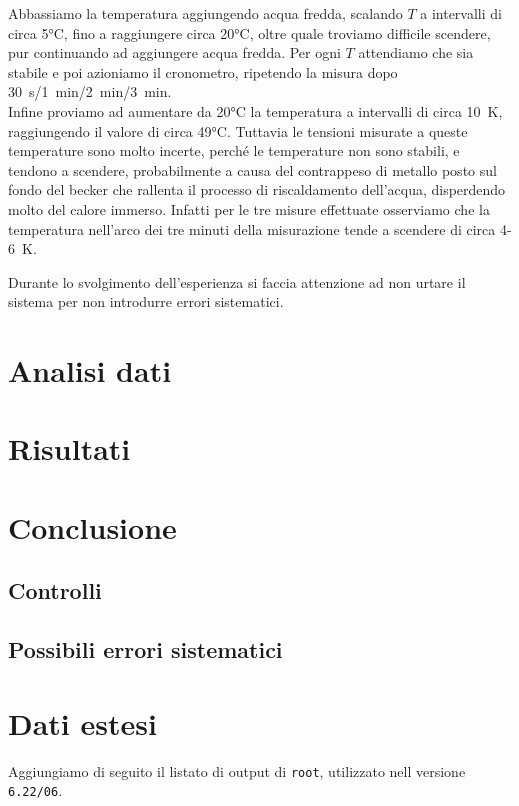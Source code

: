 \documentclass[italian, a4paper, 10pt, twocolumn]{../../style/lab_unige}
\newcommand{\cernroot}{\texttt{root}}
\begin{document}
    
    
    Abbassiamo la temperatura aggiungendo acqua fredda, scalando $T$ a intervalli di circa 5°C, fino a raggiungere circa 20°C, oltre quale troviamo difficile scendere, pur continuando ad aggiungere acqua fredda. Per ogni $T$ attendiamo che sia stabile e poi azioniamo il cronometro, ripetendo la misura dopo 30~s/1~min/2~min/3~min.\\
    Infine proviamo ad aumentare da 20°C la temperatura a intervalli di circa 10~K, raggiungendo il valore di circa 49°C. Tuttavia le tensioni misurate a queste temperature sono molto incerte, perché le temperature non sono stabili, e tendono a scendere, probabilmente a causa del contrappeso di metallo posto sul fondo del becker che rallenta il processo di riscaldamento dell'acqua, disperdendo molto del calore immerso. Infatti per le tre misure effettuate osserviamo che la temperatura nell'arco dei tre minuti della misurazione tende a scendere di circa 4-6~K.

    Durante lo svolgimento dell’esperienza si faccia attenzione ad non urtare il sistema per non introdurre errori sistematici.

    \section{Analisi dati}
    \label{section:analysis}

    \section{Risultati}
    \label{section:results}

    \section{Conclusione}
    \label{section:conclusion}

    \subsection{Controlli}

    \subsection{Possibili errori sistematici}



    \section{Dati estesi}

    Aggiungiamo di seguito il listato di output di \cernroot, utilizzato nell versione \verb|6.22/06|.
    
    
\end{document}
